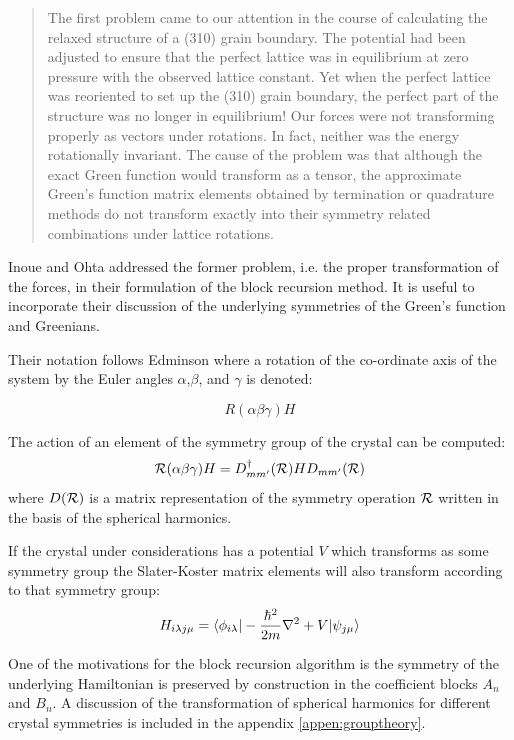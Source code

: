 \begin{quote}
The first problem came to our attention in the course of 
calculating the relaxed structure of a (310) grain boundary.
The potential had been adjusted to ensure that the perfect lattice
was in equilibrium at zero pressure with the observed lattice constant. Yet
when the perfect lattice was reoriented to set up the (310) grain boundary, the 
perfect part of the structure was no longer in equilibrium! Our forces were not transforming
properly as vectors under rotations. In fact, neither was the energy rotationally invariant.
The cause of the problem was that although the exact Green function would transform as a tensor,
the approximate Green's function matrix elements obtained by termination or quadrature
methods do not transform exactly into their symmetry related combinations under lattice 
rotations.
\end{quote}

Inoue and Ohta addressed the former problem, i.e. the proper transformation of the forces,
in their formulation of the block recursion method\cite{inoue87}. 
It is useful to incorporate their discussion of the underlying 
symmetries of the Green's function and Greenians.

Their notation follows Edminson where a rotation of the co-ordinate axis
of the system by the Euler angles $\alpha$,$\beta$, and $\gamma$ is denoted:

\begin{equation}
R(\alpha\beta\gamma)H
\end{equation}

The action of an element of the symmetry group of the crystal can be computed:
%
\begin{equation}
{\mathcal{R}}(\alpha\beta\gamma)H =  D_{mm'}^{\dagger}({\mathcal{R}})HD_{mm'}({\mathcal{R}})
\end{equation}
%
where $D({\mathcal{R}})$ is a matrix representation of the symmetry operation
${\mathcal{R}}$ written in the basis of the spherical harmonics. 

If the crystal under considerations has a potential 
$V$ which transforms as some symmetry group
the Slater-Koster matrix elements will also transform 
according to that symmetry group:
%
\begin{equation}
H_{i\lambda j\mu} = \langle \phi_{i\lambda} | -\frac{\hbar^{2}}{2m}\nabla^{2} + V|\psi_{j\mu} \rangle
\end{equation}
%

One of the motivations for the block recursion algorithm 
is the symmetry of the underlying Hamiltonian is preserved 
by construction in the coefficient blocks $A_{n}$ 
and $B_{n}$\cite{inoue87}. A discussion of the
transformation of spherical harmonics for different crystal symmetries
is included in the appendix \ref{appen:grouptheory}.

